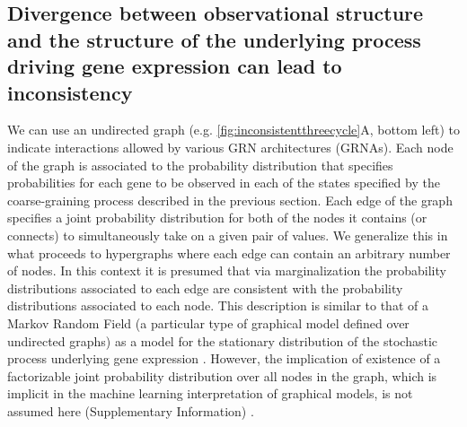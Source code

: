 \subsection{Divergence between observational structure and the structure of the underlying process driving gene expression can lead to inconsistency}
We can use an undirected graph (e.g. \ref{fig:inconsistentthreecycle}A, bottom left) to indicate interactions allowed by various GRN architectures (GRNAs). Each node of the graph is associated to the probability distribution that specifies probabilities for each gene to be observed in each of the states specified by the coarse-graining process described in the previous section. Each edge of the graph specifies a joint probability distribution for both of the nodes it contains (or connects) to simultaneously take on a given pair of values. We generalize this in what proceeds to hypergraphs where each edge can contain an arbitrary number of nodes. In this context it is presumed that via marginalization the probability distributions associated to each edge are consistent with the probability distributions associated to each node. This description is similar to that of a Markov Random Field (a particular type of graphical model defined over undirected graphs) as a model for the stationary distribution of the stochastic process underlying gene expression \cite{Lauritzen1996,Chen2013a}. However, the implication of existence of a factorizable joint probability distribution over all nodes in the graph, which is implicit in the machine learning interpretation of graphical models, is not assumed here (Supplementary Information) \cite{Barber2012,Bishop2007,Murphy2012,Koller2009}.

